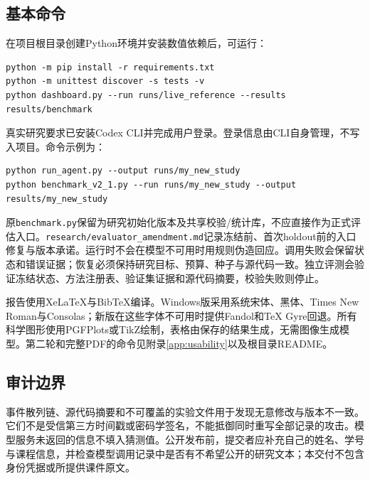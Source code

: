 \subsection{基本命令}
在项目根目录创建Python环境并安装数值依赖后，可运行：
\begin{lstlisting}
python -m pip install -r requirements.txt
python -m unittest discover -s tests -v
python dashboard.py --run runs/live_reference --results results/benchmark
\end{lstlisting}
真实研究要求已安装Codex CLI并完成用户登录。登录信息由CLI自身管理，不写入项目。命令示例为：
\begin{lstlisting}
python run_agent.py --output runs/my_new_study
python benchmark_v2_1.py --run runs/my_new_study --output results/my_new_study
\end{lstlisting}
原\texttt{benchmark.py}保留为研究初始化版本及共享校验/统计库，不应直接作为正式评估入口。\texttt{research/evaluator\_amendment.md}记录冻结前、首次holdout前的入口修复与版本承诺。运行时不会在模型不可用时用规则伪造回应。调用失败会保留状态和错误证据；恢复必须保持研究目标、预算、种子与源代码一致。独立评测会验证冻结状态、方法注册表、验证集证据和源代码摘要，校验失败则停止。

报告使用XeLaTeX与BibTeX编译。Windows版采用系统宋体、黑体、Times New Roman与Consolas；新版在这些字体不可用时提供Fandol和TeX Gyre回退。所有科学图形使用PGFPlots或TikZ绘制，表格由保存的结果生成，无需图像生成模型。第二轮和完整PDF的命令见附录\ref{app:usability}以及根目录README。

\subsection{审计边界}
事件散列链、源代码摘要和不可覆盖的实验文件用于发现无意修改与版本不一致。它们不是受信第三方时间戳或密码学签名，不能抵御同时重写全部记录的攻击。模型服务未返回的信息不填入猜测值。公开发布前，提交者应补充自己的姓名、学号与课程信息，并检查模型调用记录中是否有不希望公开的研究文本；本交付不包含身份凭据或所提供课件原文。
